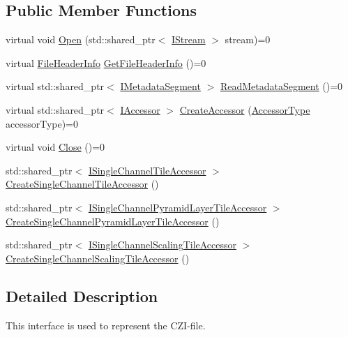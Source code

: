 \subsection*{Public Member Functions}
\begin{DoxyCompactItemize}
\item 
virtual void \hyperlink{classlib_c_z_i_1_1_i_c_z_i_reader_ae3b1a8fabae6b70480f0855fe374ecd9}{Open} (std\+::shared\+\_\+ptr$<$ \hyperlink{classlib_c_z_i_1_1_i_stream}{I\+Stream} $>$ stream)=0
\item 
virtual \hyperlink{structlib_c_z_i_1_1_file_header_info}{File\+Header\+Info} \hyperlink{classlib_c_z_i_1_1_i_c_z_i_reader_aeae9420aefeed528808a566c4cfc11a2}{Get\+File\+Header\+Info} ()=0
\item 
virtual std\+::shared\+\_\+ptr$<$ \hyperlink{classlib_c_z_i_1_1_i_metadata_segment}{I\+Metadata\+Segment} $>$ \hyperlink{classlib_c_z_i_1_1_i_c_z_i_reader_a9dbab9ddaa7ae4bcfce3c64ed5eea82d}{Read\+Metadata\+Segment} ()=0
\item 
virtual std\+::shared\+\_\+ptr$<$ \hyperlink{classlib_c_z_i_1_1_i_accessor}{I\+Accessor} $>$ \hyperlink{classlib_c_z_i_1_1_i_c_z_i_reader_a3fe8c576a58058e9bbebb9c9fd5633b0}{Create\+Accessor} (\hyperlink{namespacelib_c_z_i_aa626474324df92c9cdc7258cdb1e677c}{Accessor\+Type} accessor\+Type)=0
\item 
virtual void \hyperlink{classlib_c_z_i_1_1_i_c_z_i_reader_aef45f08b7e9cec6a40ab7ee50285eaba}{Close} ()=0
\item 
std\+::shared\+\_\+ptr$<$ \hyperlink{classlib_c_z_i_1_1_i_single_channel_tile_accessor}{I\+Single\+Channel\+Tile\+Accessor} $>$ \hyperlink{classlib_c_z_i_1_1_i_c_z_i_reader_a41d07167b2005205fc15d6d64ec280b8}{Create\+Single\+Channel\+Tile\+Accessor} ()
\item 
std\+::shared\+\_\+ptr$<$ \hyperlink{classlib_c_z_i_1_1_i_single_channel_pyramid_layer_tile_accessor}{I\+Single\+Channel\+Pyramid\+Layer\+Tile\+Accessor} $>$ \hyperlink{classlib_c_z_i_1_1_i_c_z_i_reader_af7f45db86ad27a90394bf036bfa4e985}{Create\+Single\+Channel\+Pyramid\+Layer\+Tile\+Accessor} ()
\item 
std\+::shared\+\_\+ptr$<$ \hyperlink{classlib_c_z_i_1_1_i_single_channel_scaling_tile_accessor}{I\+Single\+Channel\+Scaling\+Tile\+Accessor} $>$ \hyperlink{classlib_c_z_i_1_1_i_c_z_i_reader_a481f10b35f8f9e8afa05b0e0a3f94d59}{Create\+Single\+Channel\+Scaling\+Tile\+Accessor} ()
\end{DoxyCompactItemize}


\subsection{Detailed Description}
This interface is used to represent the C\+Z\+I-\/file. 

